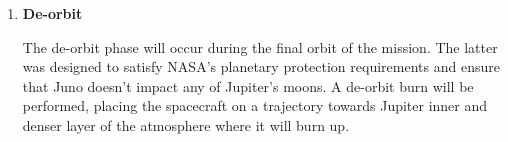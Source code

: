 \begin{enumerate}
    \item \textbf{De-orbit}
    
    The de-orbit phase will occur during the final orbit of the mission. The latter was designed to satisfy NASA's planetary protection requirements and ensure that Juno doesn't impact any of Jupiter's moons. A de-orbit burn will be performed, placing the spacecraft on a trajectory towards Jupiter inner and denser layer of the atmosphere where it will burn up.   
     
\end{enumerate}